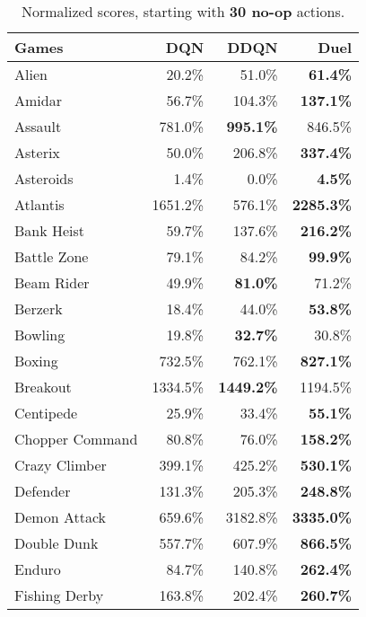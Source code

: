 \label{sec:appen}

\begin{table}[h!]
\vspace{-0.25cm}
\caption{Normalized scores, starting with {\bf 30 no-op} actions.}
\footnotesize
\begin{center}
\begin{tabular}{l|rrr}

              Games &      DQN &     DDQN &     Duel \\
              \hline 
               Alien &    20.2\% &    51.0\% &{\bf61.4\%}\\
              Amidar &    56.7\% &   104.3\% &{\bf137.1\%}\\
             Assault &   781.0\% &{\bf995.1\%}&   846.5\% \\
             Asterix &    50.0\% &   206.8\% &{\bf337.4\%}\\
           Asteroids &     1.4\% &     0.0\% &{\bf4.5\%}\\
            Atlantis &  1651.2\% &   576.1\% &{\bf2285.3\%}\\
          Bank Heist &    59.7\% &   137.6\% &{\bf216.2\%}\\
         Battle Zone &    79.1\% &    84.2\% &{\bf99.9\%}\\
          Beam Rider &    49.9\% &{\bf81.0\%}&    71.2\% \\
             Berzerk &    18.4\% &    44.0\% &{\bf53.8\%}\\
             Bowling &    19.8\% &{\bf32.7\%}&    30.8\% \\
              Boxing &   732.5\% &   762.1\% &{\bf827.1\%}\\
            Breakout &  1334.5\% &{\bf1449.2\%}&  1194.5\% \\
           Centipede &    25.9\% &    33.4\% &{\bf55.1\%}\\
     Chopper Command &    80.8\% &    76.0\% &{\bf158.2\%}\\
       Crazy Climber &   399.1\% &   425.2\% &{\bf530.1\%}\\
            Defender &   131.3\% &   205.3\% &{\bf248.8\%}\\
        Demon Attack &   659.6\% &  3182.8\% &{\bf3335.0\%}\\
         Double Dunk &   557.7\% &   607.9\% &{\bf866.5\%}\\
              Enduro &    84.7\% &   140.8\% &{\bf262.4\%}\\
       Fishing Derby &   163.8\% &   202.4\% &{\bf260.7\%}\\

\end{tabular}
\end{center}
\end{table}

